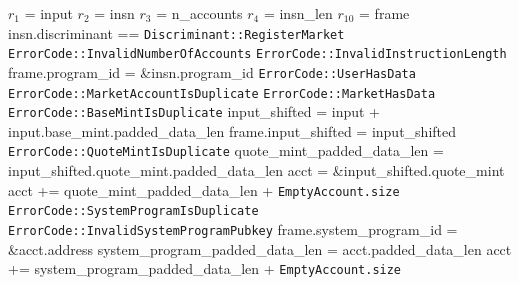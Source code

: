 \begin{algorithm}
\caption{REGISTER-MARKET}
\begin{algorithmic}
  \INPUT $r_1$ = input
  \INPUT $r_2$ = insn
  \INPUT $r_3$ = n\_accounts
  \INPUT $r_4$ = insn\_len
  \INPUT $r_{10}$ = frame
  \REQUIRE insn.discriminant == \texttt{Discriminant::RegisterMarket}
    \RETURN \texttt{ErrorCode::InvalidNumberOfAccounts}
  \ENDIF
    \RETURN \texttt{ErrorCode::InvalidInstructionLength}
  \ENDIF
  \STATE frame.program\_id = \&insn.program\_id
    \RETURN \texttt{ErrorCode::UserHasData}
  \ENDIF
    \RETURN \texttt{ErrorCode::MarketAccountIsDuplicate}
  \ENDIF
    \RETURN \texttt{ErrorCode::MarketHasData}
  \ENDIF
    \RETURN \texttt{ErrorCode::BaseMintIsDuplicate}
  \ENDIF
  \STATE input\_shifted = input + input.base\_mint.padded\_data\_len
  \STATE frame.input\_shifted = input\_shifted
    \RETURN \texttt{ErrorCode::QuoteMintIsDuplicate}
  \ENDIF
  \STATE quote\_mint\_padded\_data\_len = input\_shifted.quote\_mint.padded\_data\_len
  \STATE acct = \&input\_shifted.quote\_mint
  \STATE acct += quote\_mint\_padded\_data\_len + \texttt{EmptyAccount.size}
    \RETURN \texttt{ErrorCode::SystemProgramIsDuplicate}
  \ENDIF
    \RETURN \texttt{ErrorCode::InvalidSystemProgramPubkey}
  \ENDIF
  \STATE frame.system\_program\_id = \&acct.address
  \STATE system\_program\_padded\_data\_len = acct.padded\_data\_len
  \STATE acct += system\_program\_padded\_data\_len + \texttt{EmptyAccount.size}

\end{algorithmic}
\end{algorithm}
